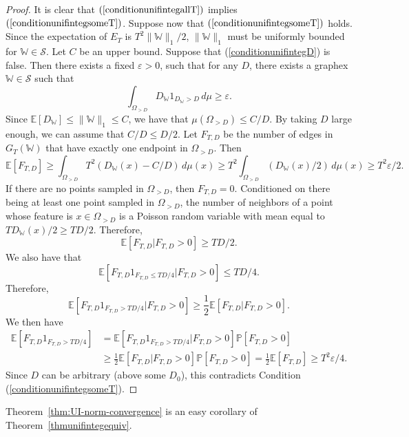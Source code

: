 \documentclass{amsart}
\numberwithin{equation}{section}
\numberwithin{figure}{section}
\theoremstyle{definition}
\theoremstyle{remark}
\newcommand{\EE}{\mathbb{E}}
\newcommand{\PP}{\mathbb{P}}
\newcommand{\cW}{\mathbb{W}}
\newcommand{\cS}{\mathcal{S}}
\begin{document}
\begin{proof}
It is clear that $(\ref{conditionunifintegallT})$ implies
$(\ref{conditionunifintegsomeT})$. Suppose now that
$(\ref{conditionunifintegsomeT})$ holds. Since the expectation of $E_T$ is
$T^2\|\cW\|_1/2$, $\|\cW\|_1$ must be uniformly bounded for $\cW \in \cS$.
Let $C$ be an upper bound. Suppose that (\ref{conditionunifintegD}) is false.
Then there exists a fixed $\varepsilon>0$, such that for any $D$, there
exists a graphex $\cW \in \cS$ such that
\[\int_{\Omega_{>D}} D_\cW 1_{D_\cW>D} \,d\mu \ge \varepsilon
.\] Since $\EE[D_\cW]\leq\|\cW\|_1 \le C$, we have that $\mu(\Omega_{>D}) \le
C/D$. By taking $D$ large enough, we can assume that $C/D \le D/2$. Let
$F_{T,D}$ be the number of edges in $G_T(\cW)$ that have exactly one endpoint
in $\Omega_{>D}$. Then
\[\EE[F_{T,D}] \ge \int_{\Omega_{>D}} T^2 \left(D_\cW(x)-C/D\right) \,d\mu(x) \ge T^2 \int_{\Omega_{>D}} \left(D_\cW(x)/2\right) \,d\mu(x) \ge T^2 \varepsilon/2
.\] If there are no points sampled in $\Omega_{>D}$, then $F_{T,D}=0$.
Conditioned on there being at least one point sampled in $\Omega_{>D}$, the
number of neighbors of a point whose feature is $x \in \Omega_{>D}$ is a
Poisson random variable with mean equal to $TD_{\cW}(x)/2 \ge TD/2$.
Therefore,
\[\EE[F_{T,D} | F_{T,D}>0] \ge TD/2
.\] We also have that
\[\EE[F_{T,D}1_{F_{T,D} \le TD/4}|F_{T,D}>0] \le TD/4
.\] Therefore,
\[\EE[F_{T,D}1_{F_{T,D}>TD/4}|F_{T,D}>0] \ge\frac 12 \EE[F_{T,D} | F_{T,D}>0]
.\] We then have
\begin{align*}
\EE[F_{T,D}1_{F_{T,D}>TD/4}]
&=\EE[F_{T,D}1_{F_{T,D}>TD/4}|F_{T,D}>0]\PP[F_{T,D}>0]
\\
&\ge \frac 12\EE[F_{T,D} | F_{T,D}>0]\PP[F_{T,D}>0]
= \frac 12\EE[F_{T,D}] \ge T^2\varepsilon/4
.
\end{align*}
Since $D$ can be arbitrary (above some $D_0$), this contradicts Condition
(\ref{conditionunifintegsomeT}).
\end{proof}

Theorem~\ref{thm:UI-norm-convergence} is an easy corollary of
Theorem~\ref{thmunifintegequiv}.
\end{document}
